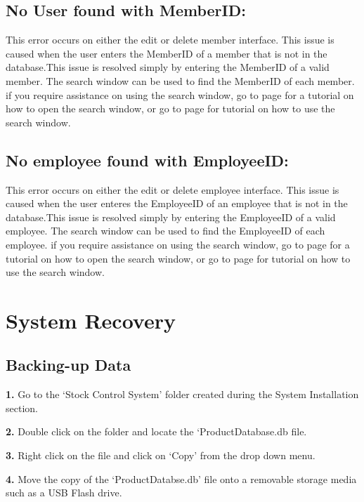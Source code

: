 \subsection{No User found with MemberID:}

This error occurs on either the edit or delete member interface. This issue is caused when the user enters the MemberID of a member that is not in the database.This issue is resolved simply by entering the MemberID of a valid member. The search window can be used to find the MemberID of each member. if you require assistance on using the search window, go to page \pageref{fig:Accessing the search window} for a tutorial on how to open the search window, or go to page \pageref{fig:Using the search window} for tutorial on how to use the search window.

\subsection{No employee found with EmployeeID:}

This error occurs on either the edit or delete employee interface. This issue is caused when the user enteres the EmployeeID of an employee that is not in the database.This issue is resolved simply by entering the EmployeeID of a valid employee. The search window can be used to find the EmployeeID of each employee. if you require assistance on using the search window, go to page \pageref{fig:Accessing the search window} for a tutorial on how to open the search window, or go to page \pageref{fig:Using the search window} for tutorial on how to use the search window.



\section{System Recovery}

\subsection{Backing-up Data}

\textbf{1.} Go to the `Stock Control System' folder created during the System Installation section.

\textbf{2.} Double click on the folder and locate the `ProductDatabase.db file.

\textbf{3.} Right click on the file and click on `Copy' from the drop down menu.

\textbf{4.} Move the copy of the `ProductDatabse.db' file onto a removable storage media such as a USB Flash drive.

